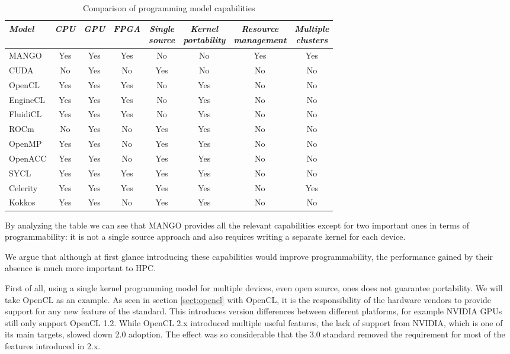 \begin{table}[ht]
    \centering
    \begin{tabular}{l|c|c|c|c|c|c|c}
    \textit{Model} & \textit{CPU} & \textit{GPU} & \textit{FPGA} & \makecell{\textit{Single} \\ \textit{source}} & \makecell{\textit{Kernel} \\ \textit{portability}} & \makecell{\textit{Resource} \\ \textit{management}} & \makecell{\textit{Multiple} \\ \textit{clusters}} \\ \hline
    MANGO & Yes & Yes & Yes & No & No & Yes & Yes \\
    CUDA & No & Yes & No & Yes & No & No & No \\
    OpenCL & Yes & Yes & Yes & No & Yes & No & No \\
    EngineCL & Yes & Yes & Yes & No & Yes & No & No \\
    FluidiCL & Yes & Yes & Yes & No & Yes & No & No \\
    ROCm & No & Yes & No & Yes & Yes & No & No \\
    OpenMP & Yes & Yes & No & Yes & Yes & No & No  \\
    OpenACC & Yes & Yes & No & Yes & Yes & No & No  \\
    SYCL & Yes & Yes & Yes & Yes & Yes & No & No \\
    Celerity & Yes & Yes & Yes & Yes & Yes & No & Yes \\
    Kokkos & Yes & Yes & No & Yes & Yes & No & No 
    \end{tabular}
    \captionsetup{justification=centering}
    \caption{Comparison of programming model capabilities}
    \label{tab:progamming-model-comparison}
\end{table}

By analyzing the table we can see that MANGO provides all the relevant capabilities except for two important ones in terms of programmability: it is not a single source approach and also requires writing a separate kernel for each device.

We argue that although at first glance introducing these capabilities would improve programmability, the performance gained by their absence is much more important to HPC.

First of all, using a single kernel programming model for multiple devices, even open source, ones does not guarantee portability. We will take OpenCL as an example. As seen in section \ref{sect:opencl} with OpenCL, it is the responsibility of the hardware vendors to provide support for any new feature of the standard. This introduces version differences between different platforms, for example NVIDIA GPUs still only support OpenCL 1.2. While OpenCL 2.x introduced multiple useful features, the lack of support from NVIDIA, which is one of its main targets, slowed down 2.0 adoption. The effect was so considerable that the 3.0 standard removed the requirement for most of the features introduced in 2.x. 

